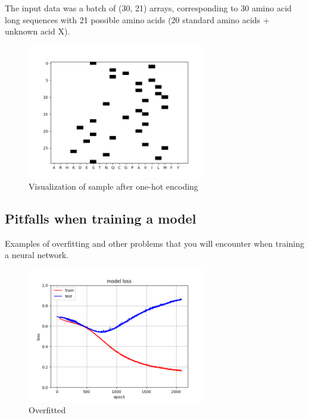 The input data was a batch of (30, 21) arrays, corresponding to 30 amino acid long sequences with 21 possible amino acids (20 standard amino acids + unknown acid X).

\begin{figure}[H]
\center
\includegraphics[width=0.7\textwidth]{pictures/sample.png}
\caption{\label{fig:sample}Visualization of sample after one-hot encoding}
\end{figure}


\subsection{Pitfalls when training a model}\label{sec:pitfalls}
Examples of overfitting and other problems that you will encounter when training a neural network.

\begin{figure}[H] %
\center
\includegraphics[width=0.7\textwidth]{pictures/overfit.png}
\caption{\label{fig:overfit}Overfitted}
\end{figure}

